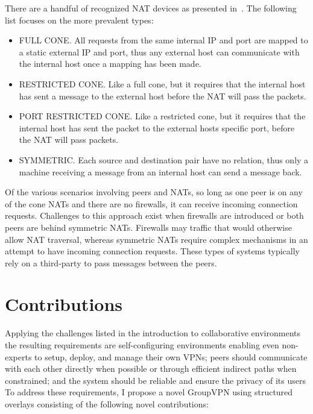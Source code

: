 There are a handful of recognized NAT devices as presented in~\cite{stun,
p2p_nats_rfc}.  The following list focuses on the more prevalent types:

\begin{itemize}

\item FULL CONE. All requests from the same internal IP and port are mapped to
a static external IP and port, thus any external host can communicate with the
internal host once a mapping has been made.

\item RESTRICTED CONE. Like a full cone, but it requires that the internal host
has sent a message to the external host before the NAT will pass the packets.

\item PORT RESTRICTED CONE. Like a restricted cone, but it requires that the
internal host has sent the packet to the external hosts specific port, before
the NAT will pass packets.

\item SYMMETRIC. Each source and destination pair have no relation, thus only a
machine receiving a message from an internal host can send a message back.

\end{itemize}

Of the various scenarios involving peers and NATs, so long as one peer is on
any of the cone NATs and there are no firewalls, it can receive incoming
connection requests.  Challenges to this approach exist when firewalls are
introduced or both peers are behind symmetric NATs.  Firewalls may traffic that
would otherwise allow NAT traversal, whereas symmetric NATs require complex
mechanisms in an attempt to have incoming connection requests.  These types of
systems typically rely on a third-party to pass messages between the peers.

\section{Contributions}

Applying the challenges listed in the introduction to collaborative
environments the resulting requirements are self-configuring environments
enabling even non-experts to setup, deploy, and manage their own VPNs; peers
should communicate with each other directly when possible or through efficient
indirect paths when constrained; and the system should be reliable and ensure
the privacy of its users To address these requirements, I propose a novel
GroupVPN using structured overlays consisting of the following novel
contributions:

